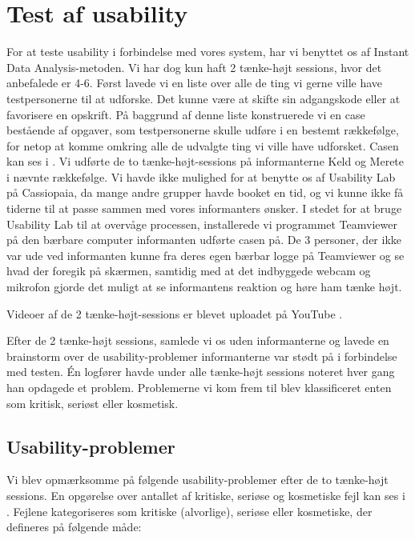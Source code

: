 \section{Test af usability}
\label{sec:usability}

For at teste usability i forbindelse med vores system, har vi benyttet os af Instant Data Analysis-metoden\cite{debida}. Vi har dog kun haft 2 tænke-højt sessions, hvor det anbefalede er 4-6. Først lavede vi en liste over alle de ting vi gerne ville have testpersonerne til at udforske. Det kunne \fx være at skifte sin adgangskode eller at favorisere en opskrift. På baggrund af denne liste konstruerede vi en case bestående af opgaver, som testpersonerne skulle udføre i en bestemt rækkefølge, for netop at komme omkring alle de udvalgte ting vi ville have udforsket. Casen kan ses i . Vi udførte de to tænke-højt-sessions på informanterne Keld og Merete i nævnte rækkefølge. Vi havde ikke mulighed for at benytte os af Usability Lab på Cassiopaia, da mange andre grupper havde booket en tid, og vi kunne ikke få tiderne til at passe sammen med vores informanters ønsker. I stedet for at bruge Usability Lab til at overvåge processen, installerede vi programmet Teamviewer på den bærbare computer informanten udførte casen på. De 3 personer, der ikke var ude ved informanten kunne fra deres egen bærbar logge på Teamviewer og se hvad der foregik på skærmen, samtidig med at det indbyggede webcam og mikrofon gjorde det muligt at se informantens reaktion og høre ham tænke højt.

Videoer af de 2 tænke-højt-sessions er blevet uploadet på YouTube \cite{usabilitykjeld} \cite{usabilitymerete}.

Efter de 2 tænke-højt sessions, samlede vi os uden informanterne og lavede en brainstorm over de usability-problemer informanterne var stødt på i forbindelse med testen. Én logfører havde under alle tænke-højt sessions noteret hver gang han opdagede et problem. Problemerne vi kom frem til blev klassificeret enten som kritisk, seriøst eller kosmetisk.

\subsection{Usability-problemer}
Vi blev opmærksomme på følgende usability-problemer efter de to tænke-højt sessions. En opgørelse over antallet af kritiske, seriøse og kosmetiske fejl kan ses i . Fejlene kategoriseres som kritiske (alvorlige), seriøse eller kosmetiske, der defineres på følgende måde:

